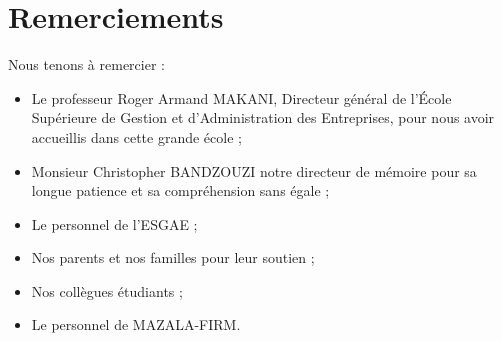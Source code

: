 \chapter*{Remerciements}

Nous tenons à remercier : \\
\begin{itemize}
  \item {
      Le professeur Roger Armand MAKANI, Directeur général de l’École
      Supérieure de Gestion et d’Administration des Entreprises,
      pour nous avoir accueillis dans cette grande école ;
    }
  \item {
      Monsieur Christopher BANDZOUZI notre directeur de mémoire pour sa
      longue patience et sa compréhension sans égale ;
    }
  \item {
      Le personnel de l’ESGAE ;
    }

  \item {
      Nos parents et nos familles pour leur soutien ;
    }

  \item {
      Nos collègues étudiants ;
    }

  \item {
      Le personnel de MAZALA-FIRM.
    }

\end{itemize}
